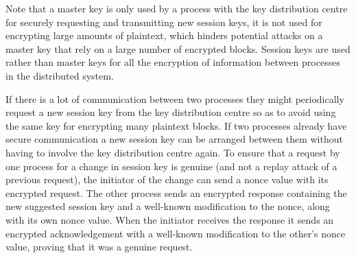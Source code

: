 Note that a master key is only used by a process with the key distribution
centre for securely requesting and transmitting new session keys, it is not
used for encrypting large amounts of plaintext, which hinders potential attacks on
a master key that rely on a large number of encrypted blocks.
Session keys are used rather than master keys for all the encryption
of information between processes in the distributed system.

If there is a lot of communication between two processes they might
periodically request a new session key from the key distribution centre
so as to avoid using the same key for encrypting many plaintext blocks.
If two processes already have secure communication a new
session key can be arranged between them without having to involve
the key distribution centre again.
To ensure that a request by one process for a change in session key is genuine
(and not a replay attack of a previous request),
the initiator of the change can send a nonce value with its encrypted request.
The other process sends an encrypted response containing the new suggested
session key and a well-known modification to the nonce, along with its
own nonce value. When the initiator receives the response it
sends an encrypted acknowledgement with a well-known modification
to the other's nonce value, proving that it was a genuine request.

